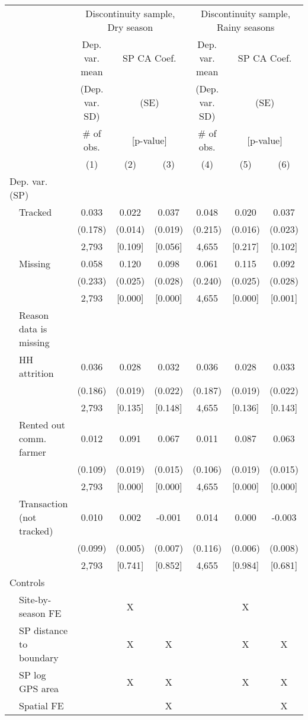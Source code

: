 \begin{tabular}{llcccccc}
\hline \hline
 & & \multicolumn{3}{c}{Discontinuity sample, Dry season} & \multicolumn{3}{c}{Discontinuity sample, Rainy seasons} \\
\cmidrule(lr){3-5}\cmidrule(lr){6-8}
 & & Dep. var. mean & \multicolumn{2}{c}{SP CA Coef.} & Dep. var. mean & \multicolumn{2}{c}{SP CA Coef.} \\
 & & (Dep. var. SD) & \multicolumn{2}{c}{(SE)} & (Dep. var. SD) & \multicolumn{2}{c}{(SE)} \\
 & & \# of obs. & \multicolumn{2}{c}{[p-value]} & \# of obs. & \multicolumn{2}{c}{[p-value]} \\
\cmidrule(lr){4-5}\cmidrule(lr){7-8}
 & & (1) & (2) & (3) & (4) & (5) & (6) \\
\hline
\multicolumn{2}{l}{Dep. var. (SP)} & & & & & & \\
\cmidrule(lr){1-2}
 & Tracked & 0.033 & 0.022 & 0.037 & 0.048 & 0.020 & 0.037 \\
 & & (0.178) & (0.014) & (0.019) & (0.215) & (0.016) & (0.023) \\
 & & 2,793 & [0.109] & [0.056] & 4,655 & [0.217] & [0.102] \\[0.5em]
 & Missing & 0.058 & 0.120 & 0.098 & 0.061 & 0.115 & 0.092 \\
 & & (0.233) & (0.025) & (0.028) & (0.240) & (0.025) & (0.028) \\
 & & 2,793 & [0.000] & [0.000] & 4,655 & [0.000] & [0.001] \\[0.5em]
 & Reason data is missing & & & & & & \\
\cmidrule(lr){2-2}
 & \hspace{0.5em}HH attrition & 0.036 & 0.028 & 0.032 & 0.036 & 0.028 & 0.033 \\
 & & (0.186) & (0.019) & (0.022) & (0.187) & (0.019) & (0.022) \\
 & & 2,793 & [0.135] & [0.148] & 4,655 & [0.136] & [0.143] \\[0.5em]
 & \hspace{0.5em}Rented out comm. farmer & 0.012 & 0.091 & 0.067 & 0.011 & 0.087 & 0.063 \\
 & & (0.109) & (0.019) & (0.015) & (0.106) & (0.019) & (0.015) \\
 & & 2,793 & [0.000] & [0.000] & 4,655 & [0.000] & [0.000] \\[0.5em]
 & \hspace{0.5em}Transaction (not tracked) & 0.010 & 0.002 & -0.001 & 0.014 & 0.000 & -0.003 \\
 & & (0.099) & (0.005) & (0.007) & (0.116) & (0.006) & (0.008) \\
 & & 2,793 & [0.741] & [0.852] & 4,655 & [0.984] & [0.681] \\
\hline
\multicolumn{2}{l}{Controls} & & & & & & \\
\cmidrule(lr){1-2}
 & Site-by-season FE &  & X &  &  & X &  \\
 & SP distance to boundary &  & X & X &  & X & X \\
 & SP log GPS area &  & X & X &  & X & X \\
 & Spatial FE &  &  & X &  &  & X \\
\hline
\end{tabular}
